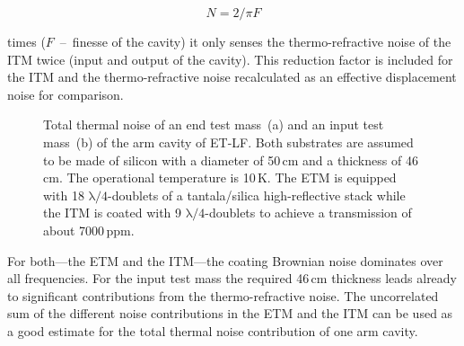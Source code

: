 \begin{equation}
N=2/\pi F
\label{eq:red_factor}
\end{equation}

times ($F$~--~finesse of the cavity) it only senses the thermo-refractive noise of the ITM twice (input and output of the cavity). This reduction factor is included for the ITM and the thermo-refractive noise recalculated as an effective displacement noise for comparison.

\begin{figure}[!h]
\begin{center}
\end{center}
\caption{Total thermal noise of an end test mass~(a) and an input test mass~(b) of the arm cavity of ET-LF. Both substrates are assumed to be made of silicon with a diameter of 50\,cm and a thickness of 46\,cm. The operational temperature is 10\,K. The ETM is equipped with 18 $\mathrm{\lambda/4}$-doublets of a tantala/silica high-reflective stack while the ITM is coated with 9 $\mathrm{\lambda/4}$-doublets to achieve a transmission of about 7000\,ppm.}
\end{figure}

For both---the ETM and the ITM---the coating Brownian noise dominates over all frequencies. For the input test mass the required 46\,cm thickness leads already to significant contributions from the thermo-refractive noise. The uncorrelated sum of the different noise contributions in the ETM and the ITM can be used as a good estimate for the total thermal noise contribution of one arm cavity. 

